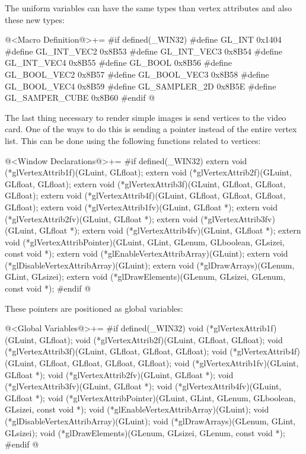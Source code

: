 The uniform variables can have the same types than vertex attributes
and also these new types:

\iniciocodigo
@<Macro Definition@>+=
#if defined(_WIN32)
#define GL_INT         0x1404
#define GL_INT_VEC2    0x8B53
#define GL_INT_VEC3    0x8B54
#define GL_INT_VEC4    0x8B55
#define GL_BOOL        0x8B56
#define GL_BOOL_VEC2   0x8B57
#define GL_BOOL_VEC3   0x8B58
#define GL_BOOL_VEC4   0x8B59
#define GL_SAMPLER_2D  0x8B5E
#define GL_SAMPER_CUBE 0x8B60
#endif
@
\fimcodigo

The last thing necessary to render simple images is send vertices to
the video card. One of the ways to do this is sending a pointer
instead of the entire vertex list. This can be done using the
following functions related to vertices:

\iniciocodigo
@<Window Declarations@>+=
#if defined(_WIN32)
extern void (*glVertexAttrib1f)(GLuint, GLfloat);
extern void (*glVertexAttrib2f)(GLuint, GLfloat, GLfloat);
extern void (*glVertexAttrib3f)(GLuint, GLfloat, GLfloat, GLfloat);
extern void (*glVertexAttrib4f)(GLuint, GLfloat, GLfloat, GLfloat, GLfloat);
extern void (*glVertexAttrib1fv)(GLuint, GLfloat *);
extern void (*glVertexAttrib2fv)(GLuint, GLfloat *);
extern void (*glVertexAttrib3fv)(GLuint, GLfloat *);
extern void (*glVertexAttrib4fv)(GLuint, GLfloat *);
extern void (*glVertexAttribPointer)(GLuint, GLint, GLenum, GLboolean,
                                     GLsizei, const void *);
extern void (*glEnableVertexAttribArray)(GLuint);
extern void (*glDisableVertexAttribArray)(GLuint);
extern void (*glDrawArrays)(GLenum, GLint, GLsizei);
extern void (*glDrawElements)(GLenum, GLsizei, GLenum, const void *);
#endif
@
\fimcodigo

These pointers are positioned as global variables:

\iniciocodigo
@<Global Variables@>+=
#if defined(_WIN32)
void (*glVertexAttrib1f)(GLuint, GLfloat);
void (*glVertexAttrib2f)(GLuint, GLfloat, GLfloat);
void (*glVertexAttrib3f)(GLuint, GLfloat, GLfloat, GLfloat);
void (*glVertexAttrib4f)(GLuint, GLfloat, GLfloat, GLfloat, GLfloat);
void (*glVertexAttrib1fv)(GLuint, GLfloat *);
void (*glVertexAttrib2fv)(GLuint, GLfloat *);
void (*glVertexAttrib3fv)(GLuint, GLfloat *);
void (*glVertexAttrib4fv)(GLuint, GLfloat *);
void (*glVertexAttribPointer)(GLuint, GLint, GLenum, GLboolean,
                              GLsizei, const void *);
void (*glEnableVertexAttribArray)(GLuint);
void (*glDisableVertexAttribArray)(GLuint);
void (*glDrawArrays)(GLenum, GLint, GLsizei);
void (*glDrawElements)(GLenum, GLsizei, GLenum, const void *);
#endif
@
\fimcodigo

